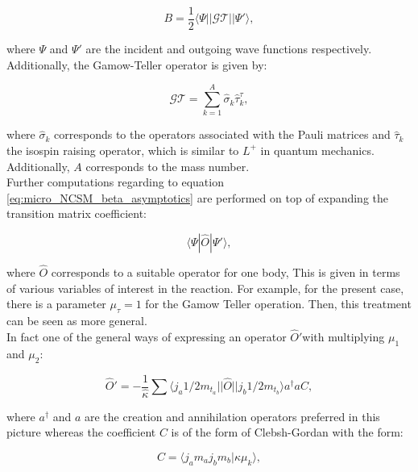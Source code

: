 \documentclass[openany]{book}
\begin{document}
\begin{equation}\label{eq:micro_NCSM_beta_asymptotics}
	B = \frac{1}{2} \langle \Psi || \mathcal{GT} || \Psi ' \rangle, 
\end{equation}

where $\Psi$ and $\Psi'$ are the incident and outgoing wave functions respectively. Additionally, the Gamow-Teller operator is given by: 

 \begin{equation}\label{eq:micro_NCSM_beta_GToperator}
 	\mathcal{GT} = \sum_{k = 1}^{A} \hat \sigma_k \hat \tau_k^{\tau},
 \end{equation}

where $\hat \sigma_k$ corresponds to the operators associated with the Pauli matrices and $\hat \tau_k$ the isospin raising operator, which is similar to $L^{+}$ in quantum mechanics. Additionally, $A$ corresponds to the mass number. \\ 

Further computations regarding to equation \ref{eq:micro_NCSM_beta_asymptotics} are performed on top of expanding the transition matrix coefficient: 


\begin{equation}\label{eq:micro_NCSM_beta_transition}
	\langle \Psi | \hat O |  \Psi ' \rangle,
\end{equation}

where $ \hat O$ corresponds to a suitable operator for one body, This is given in terms of various variables of interest in the reaction. For example, for the present case, there is a parameter $\mu_\tau = 1$ for the Gamow Teller operation. Then, this treatment can be seen as more general. \\

In fact one of the general ways of expressing an operator  $\hat O' $with multiplying $\mu_1$ and $\mu_2$:

\begin{equation}\label{eq:micro_NCSM_beta_operator}
	 \hat O ' = - \frac{1}{\hat \kappa} \sum \langle j_a 1/2 m_{t_a} || \hat O || j_b 1/2 m_{t_b} \rangle a^{\dagger} a C,
\end{equation}

where $a^{\dagger}$ and $a$ are the creation and annihilation operators preferred in this picture whereas the coefficient $C$ is of the form of Clebsh-Gordan with the form: 

\begin{equation}\label{eq:micro_NCSM_beta_coefficient}
	C = \langle j_a m_a j_b m_b | \kappa \mu_k \rangle,
\end{equation}
\end{document}
